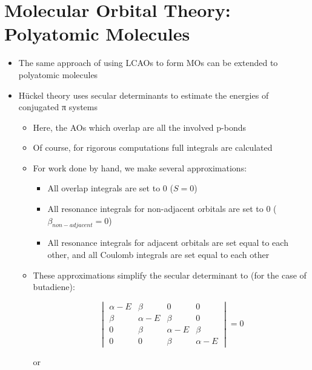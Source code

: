 \documentclass[12pt, openany, letterpaper]{memoir}
\begin{document}
\section{Molecular Orbital Theory: Polyatomic Molecules}
\begin{itemize}
	\item The same approach of using LCAOs to form MOs can be extended to polyatomic molecules
	\item H\"uckel theory uses secular determinants to estimate the energies of conjugated π systems
	\begin{itemize}
		\item Here, the AOs which overlap are all the involved p-bonds
		\item Of course, for rigorous computations full integrals are calculated
		\item For work done by hand, we make several approximations: 
		\begin{itemize}
			\item All overlap integrals are set to 0 ($S=0$)
			\item All resonance integrals for non-adjacent orbitals are set to 0 ($\beta_{non-adjacent}=0$)
			\item All resonance integrals for adjacent orbitals are set equal to each other, and all Coulomb integrals are set equal to each other
		\end{itemize}
		\item These approximations simplify the secular determinant to (for the case of butadiene):
		
		\[\begin{vmatrix} 
		\alpha -E & \beta & 0 & 0 \\
		\beta & \alpha - E & \beta & 0 \\
		0 & \beta & \alpha - E & \beta \\
		0 & 0 & \beta & \alpha -E
		\end{vmatrix} =0\]
		
		or
		

\end{itemize}
\end{itemize}
\end{document}
